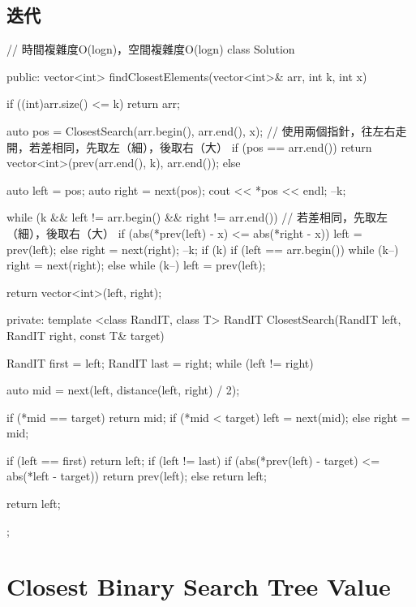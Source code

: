 \subsection{迭代}
\begin{Code}
// 時間複雜度O(logn)，空間複雜度O(logn)
class Solution {
public:
    vector<int> findClosestElements(vector<int>& arr, int k, int x) {
        if ((int)arr.size() <= k) return arr;

        auto pos = ClosestSearch(arr.begin(), arr.end(), x);
        // 使用兩個指針，往左右走開，若差相同，先取左（細），後取右（大）
        if (pos == arr.end()) {
            return vector<int>(prev(arr.end(), k), arr.end());
        }
        else {
            auto left = pos;
            auto right = next(pos);
            cout << *pos << endl;
            --k;

            while (k && left != arr.begin() && right != arr.end()) {
                // 若差相同，先取左（細），後取右（大）
                if (abs(*prev(left) - x) <= abs(*right - x))
                    left = prev(left);
                else
                    right = next(right);
                --k;
            }
            if (k) {
                if (left == arr.begin()) {
                    while (k--) right = next(right);
                }
                else {
                    while (k--) left = prev(left);
                }
            }

            return vector<int>(left, right);
        }
    }
private:
    template <class RandIT, class T>
        RandIT ClosestSearch(RandIT left, RandIT right, const T& target) {
        RandIT first = left;
        RandIT last = right;
        while (left != right) {
            auto mid = next(left, distance(left, right) / 2);

            if (*mid == target) return mid;
            if (*mid < target)
                left = next(mid);
            else
                right = mid;
        }

        if (left == first) return left;
        if (left != last) {
            if (abs(*prev(left) - target) <= abs(*left - target))
                return prev(left);
            else
                return left;
        }

        return left;
    }
};
\end{Code}


\section{Closest Binary Search Tree Value} %
\label{sec:closest-binary-search-tree-value}


